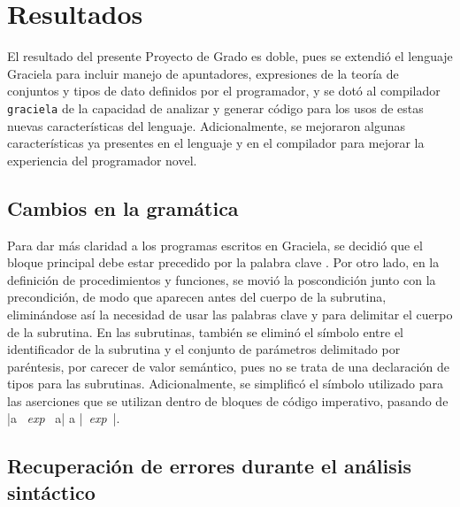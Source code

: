 \chapter{Resultados}
\label{capitulo4}

El resultado del presente Proyecto de Grado es doble, pues se extendió el
lenguaje Graciela para incluir manejo de apuntadores, expresiones de la teoría
de conjuntos y tipos de dato definidos por el programador, y se dotó al
compilador \texttt{graciela} de la capacidad de analizar y generar código para
los usos de estas nuevas características del lenguaje. Adicionalmente, se
mejoraron algunas características ya presentes en el lenguaje y en el compilador
para mejorar la experiencia del programador novel.

\section{Cambios en la gramática}

Para dar más claridad a los programas escritos en Graciela, se decidió que el
bloque principal debe estar precedido por la palabra clave . Por
otro lado, en la definición de procedimientos y funciones, se movió la
poscondición junto con la precondición, de modo que aparecen antes del cuerpo de
la subrutina, eliminándose así la necesidad de usar las palabras clave
 y  para delimitar el cuerpo de la subrutina. En las
subrutinas, también se eliminó el  símbolo \ingra{:} entre el identificador de
la subrutina y el conjunto de parámetros delimitado por paréntesis, por carecer
de valor semántico, pues no se trata de una declaración de tipos para las
subrutinas. Adicionalmente, se simplificó el símbolo utilizado para las
aserciones que se utilizan dentro de bloques de código imperativo, pasando de
\ingra|{a ~\textit{exp}~ a}| a \ingra|{~\textit{exp}~}|.

\section{Recuperación de errores durante el análisis sintáctico}

